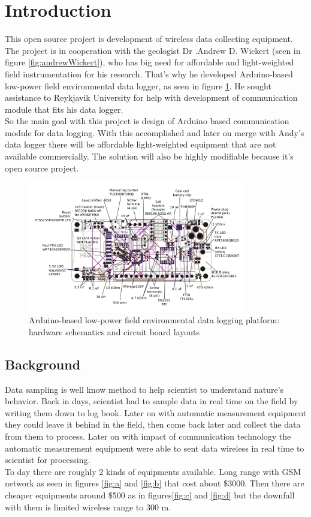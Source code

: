 \section{Introduction}
This open source project is development of wireless data collecting equipment. The project is in cooperation with the geologist Dr .Andrew D. Wickert (seen in figure \ref{fig:andrewWickert}), who has big need for affordable and light-weighted field instrumentation for his research. That's why he developed Arduino-based low-power field environmental data logger, as seen in figure \ref{fig:BottleLog}. He sought assistance to Reykjavik University for help with development of communication module that fits his data logger.\\
So the main goal with this project is design of Arduino based communication module for data logging. With this accomplished and later on merge with Andy's data logger there will be affordable light-weighted equipment that are not available commercially. The solution will also be highly modifiable because it's open source project.

\begin{figure}
\centering
\includegraphics[height=5.7cm]{graphics/ALog_drawing.PDF}
\caption{Arduino-based low-power field environmental data logging platform: hardware schematics and circuit board layouts\label{fig:BottleLog}\cite{ALog-BottleLogger}}
\end{figure}

\subsection{Background}
Data sampling is well know method to help scientist to understand nature's behavior. Back in days, scientist had to sample data in real time on the field by writing them down to log book. Later on with automatic measurement equipment they could leave it behind in the field, then come back later and collect the data from them to process. Later on with impact of communication technology the automatic measurement equipment were able to sent data wireless in real time to scientist for processing.\\
To day there are roughly 2 kinds of equipments available. Long range with GSM network as seen in figures \ref{fig:a} and \ref{fig:b} that cost about \$3000. Then there are cheaper equipments around \$500 as in figures\ref{fig:c} and  \ref{fig:d} but the downfall with them is limited wireless range to 300 m.

